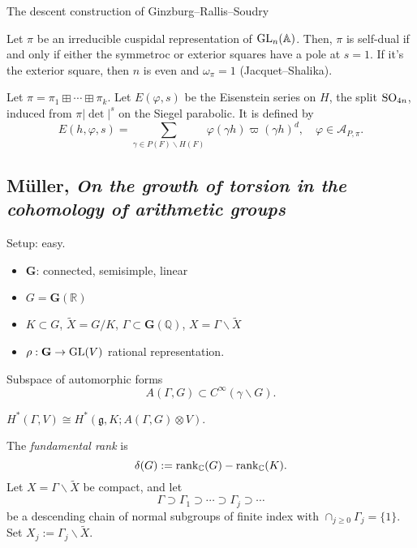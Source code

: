 \documentclass[reqno]{amsart} 
\begin{document}
The descent construction of Ginzburg--Rallis--Soudry

Let $\pi$ be an irreducible cuspidal representation of $\operatorname{GL} _n(\mathbb{A})$.  Then, $\pi$ is self-dual if and only if either the symmetroc or exterior squares have a pole at $s=1$.  If it's the exterior square, then $n$ is even and $\omega_\pi = 1$ (Jacquet--Shalika).

Let $\pi = \pi_1 \boxplus \dotsb \boxplus \pi_k  $.
Let $E (\varphi, s)$ be the Eisenstein series on $H$, the split $\operatorname{SO}_{4 n}$, induced from $\pi \lvert \det  \rvert^{s}$ on the Siegel parabolic.  It is defined by
\begin{equation*}
  E (h, \varphi, s) = \sum_{\gamma \in P (F) \backslash H (F) }
  \varphi (\gamma h)
  \varpi (\gamma h)^{d},
  \quad
  \varphi \in \mathcal{A}_{P, \pi }.
\end{equation*}

\subsection{M{\"u}ller, \emph{On the growth of torsion in the cohomology of arithmetic groups}}

Setup: easy.
\begin{itemize}
\item $\mathbf{G}$: connected, semisimple, linear
\item $G = \mathbf{G} (\mathbb{R})$
\item $K \subset G$, $\tilde{X} = G / K$, $\Gamma \subset \mathbf{G} (\mathbb{Q})$, $X = \Gamma \backslash \tilde{X}$
\item $\rho : \mathbf{G} \rightarrow \operatorname{GL} (V)$ rational representation.
\end{itemize}
Subspace of automorphic forms
\begin{equation*}
A (\Gamma, G) \subset C^\infty (\gamma \backslash G).
\end{equation*}
\begin{theorem}[Franke]
  $H^\ast (\Gamma, V) \cong H^\ast (\mathfrak{g}, K; A (\Gamma, G) \otimes V)$.
\end{theorem}

The \emph{fundamental rank} is
\begin{equation*}
\delta (G) := \operatorname{rank}_{\mathbb{C} } (G) - \operatorname{rank}_{\mathbb{C} } (K).
\end{equation*}
Let $X = \Gamma \backslash \tilde{X}$ be compact, and let
\begin{equation*}
\Gamma \supset \Gamma_1 \supset \dotsb \supset \Gamma_j \supset \dotsb
\end{equation*}
be a descending chain of normal subgroups of finite index with $\cap_{j \geq 0} \Gamma_j  = \{1\}$.  Set $X_j := \Gamma_j \backslash \tilde{X}$.
\end{document}
